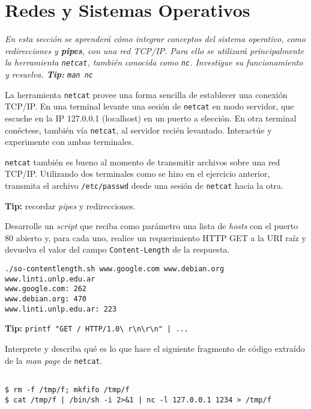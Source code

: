 \section{Redes y Sistemas Operativos}

\textit{En esta sección se aprenderá cómo integrar conceptos del sistema
  operativo, como redirecciones y \textbf{pipes}, con una red TCP/IP. Para
  ello se utilizará principalmente la herramienta \texttt{netcat}, también
  conocida como \texttt{nc}. Investigue
  su funcionamiento y resuelva. \textbf{Tip:} \texttt{man nc}}

\begin{questions}
  \question La herramienta \texttt{netcat} provee una forma sencilla de
  establecer una conexión TCP/IP. En una terminal levante una sesión de
  \texttt{netcat} en modo servidor, que escuche en la IP 127.0.0.1
  (localhost) en un puerto a elección. En otra terminal conéctese, también
  vía \texttt{netcat}, al servidor recién levantado. Interactúe y
  experimente con ambas terminales.

  \question \texttt{netcat} también es bueno al momento de transmitir
  archivos sobre una red TCP/IP. Utilizando dos terminales como se hizo en
  el ejercicio anterior, transmita el archivo \texttt{/etc/passwd} desde
  una sesión de \texttt{netcat} hacia la otra.

  \textbf{Tip:} recordar \textit{pipes} y redirecciones.

  \question Desarrolle un \textit{script} que reciba como parámetro una
  lista de \textit{hosts} con el puerto 80 abierto y, para cada uno,
  realice un requerimiento HTTP GET a la URI raíz y devuelva el valor del
  campo \texttt{Content-Length} de la respuesta.
  \begin{lstlisting}
./so-contentlength.sh www.google.com www.debian.org www.linti.unlp.edu.ar
www.google.com: 262
www.debian.org: 470
www.linti.unlp.edu.ar: 223
  \end{lstlisting}

  \textbf{Tip:} \texttt{printf "GET / HTTP/1.0\textbackslash
    r\textbackslash n\textbackslash r\textbackslash n" | ... }

  \question Interprete y describa qué es lo que hace el siguiente fragmento
  de código extraído de la \textit{man page} de \texttt{netcat}.
  \begin{lstlisting}

$ rm -f /tmp/f; mkfifo /tmp/f
$ cat /tmp/f | /bin/sh -i 2>&1 | nc -l 127.0.0.1 1234 > /tmp/f
  \end{lstlisting}


\end{questions}

